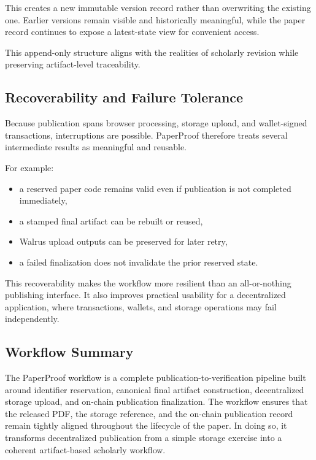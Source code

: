 \documentclass[journal]{IEEEtran}
\begin{document}
This creates a new immutable version record rather than overwriting the existing one. Earlier versions remain visible and historically meaningful, while the paper record continues to expose a latest-state view for convenient access.

This append-only structure aligns with the realities of scholarly revision while preserving artifact-level traceability.

\subsection{Recoverability and Failure Tolerance}

Because publication spans browser processing, storage upload, and wallet-signed transactions, interruptions are possible. PaperProof therefore treats several intermediate results as meaningful and reusable.

For example:
\begin{itemize}
    \item a reserved paper code remains valid even if publication is not completed immediately,
    \item a stamped final artifact can be rebuilt or reused,
    \item Walrus upload outputs can be preserved for later retry,
    \item a failed finalization does not invalidate the prior reserved state.
\end{itemize}


This recoverability makes the workflow more resilient than an all-or-nothing publishing interface. It also improves practical usability for a decentralized application, where transactions, wallets, and storage operations may fail independently.

\subsection{Workflow Summary}

The PaperProof workflow is a complete publication-to-verification pipeline built around identifier reservation, canonical final artifact construction, decentralized storage upload, and on-chain publication finalization. The workflow ensures that the released PDF, the storage reference, and the on-chain publication record remain tightly aligned throughout the lifecycle of the paper. In doing so, it transforms decentralized publication from a simple storage exercise into a coherent artifact-based scholarly workflow.
\end{document}

